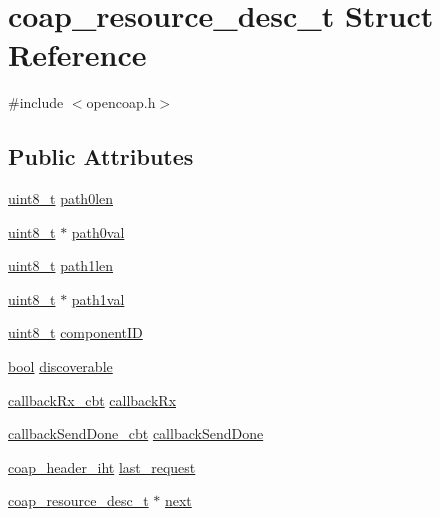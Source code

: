 \hypertarget{structcoap__resource__desc__t}{}\section{coap\+\_\+resource\+\_\+desc\+\_\+t Struct Reference}
\label{structcoap__resource__desc__t}


{\ttfamily \#include $<$opencoap.\+h$>$}

\subsection*{Public Attributes}
\begin{DoxyCompactItemize}
\item 
\hyperlink{_p_e___types_8h_aba7bc1797add20fe3efdf37ced1182c5}{uint8\+\_\+t} \hyperlink{structcoap__resource__desc__t_a2908758c1eaa98dfcc2f22041b234487}{path0len}
\item 
\hyperlink{_p_e___types_8h_aba7bc1797add20fe3efdf37ced1182c5}{uint8\+\_\+t} $\ast$ \hyperlink{structcoap__resource__desc__t_a1e3ae5093c0ce7fb9c517574e01d3823}{path0val}
\item 
\hyperlink{_p_e___types_8h_aba7bc1797add20fe3efdf37ced1182c5}{uint8\+\_\+t} \hyperlink{structcoap__resource__desc__t_a49ef6bc18d9dfbcf6b58e4f4e7fa5dec}{path1len}
\item 
\hyperlink{_p_e___types_8h_aba7bc1797add20fe3efdf37ced1182c5}{uint8\+\_\+t} $\ast$ \hyperlink{structcoap__resource__desc__t_a424767ff73cda7aefafb0ff79c98b782}{path1val}
\item 
\hyperlink{_p_e___types_8h_aba7bc1797add20fe3efdf37ced1182c5}{uint8\+\_\+t} \hyperlink{structcoap__resource__desc__t_af55b65f7e045f7c35bb2cee3d7180e56}{component\+ID}
\item 
\hyperlink{_p_e___types_8h_a97a80ca1602ebf2303258971a2c938e2}{bool} \hyperlink{structcoap__resource__desc__t_a1b049b2ba4a1999df4318008888b429b}{discoverable}
\item 
\hyperlink{group__open_coap_gac41957963dd35c0f62acbb44f369fa61}{callback\+Rx\+\_\+cbt} \hyperlink{structcoap__resource__desc__t_a32c5317762d028b57928be96f89a4395}{callback\+Rx}
\item 
\hyperlink{group__open_coap_ga62a54b4b86c9835fe33d997b069193bc}{callback\+Send\+Done\+\_\+cbt} \hyperlink{structcoap__resource__desc__t_ad4ccfb979e92f1a4575f4641414880de}{callback\+Send\+Done}
\item 
\hyperlink{structcoap__header__iht}{coap\+\_\+header\+\_\+iht} \hyperlink{structcoap__resource__desc__t_a1e4819f8c8313ab390b94c98a62fc808}{last\+\_\+request}
\item 
\hyperlink{structcoap__resource__desc__t}{coap\+\_\+resource\+\_\+desc\+\_\+t} $\ast$ \hyperlink{structcoap__resource__desc__t_a6fb7e00693fd97848fa72ac36e7dc0eb}{next}
\end{DoxyCompactItemize}


